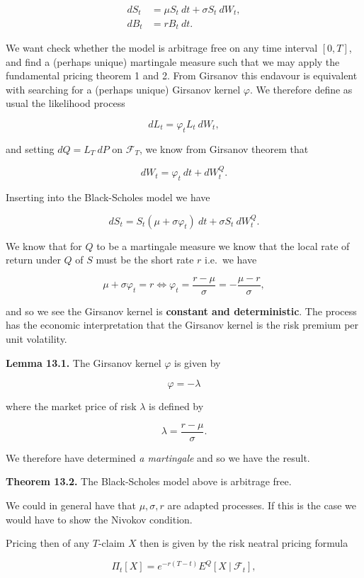 \documentclass[
]{article}
\begin{document}
\begin{align*}
dS_t &= \mu S_t\ dt+\sigma S_t\ dW_t,\\
dB_t &= r B_t\ dt.
\end{align*}

We want check whether the model is arbitrage free on any time interval
\([0,T]\), and find a (perhaps unique) martingale measure such that we
may apply the fundamental pricing theorem 1 and 2. From Girsanov this
endavour is equivalent with searching for a (perhaps unique) Girsanov
kernel \(\varphi\). We therefore define as usual the likelihood process

\[
dL_t=\varphi_ tL_t\ dW_t,
\]

and setting \(dQ=L_T\ dP\) on \(\mathcal{F}_T\), we know from Girsanov
theorem that

\[
dW_t=\varphi_t\ dt+dW_t^Q.
\]

Inserting into the Black-Scholes model we have

\[
dS_t=S_t(\mu + \sigma \varphi_t)\ dt+\sigma S_t\ dW_t^Q.
\]

We know that for \(Q\) to be a martingale measure we know that the local
rate of return under \(Q\) of \(S\) must be the short rate \(r\) i.e.~we
have

\[
\mu + \sigma \varphi_t=r\iff \varphi_t=\frac{r-\mu}{\sigma}=-\frac{\mu -r}{\sigma},
\]

and so we see the Girsanov kernel is \textbf{constant and
deterministic}. The process has the economic interpretation that the
Girsanov kernel is the risk premium per unit volatility.

\textbf{Lemma 13.1.} The Girsanov kernel \(\varphi\) is given by

\[
\varphi = -\lambda
\]

where the market price of risk \(\lambda\) is defined by

\[
\lambda =\frac{r-\mu}{\sigma}.
\]

We therefore have determined \emph{a martingale} and so we have the
result.

\textbf{Theorem 13.2.} The Black-Scholes model above is arbitrage free.

We could in general have that \(\mu,\sigma,r\) are adapted processes. If
this is the case we would have to show the Nivokov condition.

Pricing then of any \(T\)-claim \(X\) then is given by the risk neatral
pricing formula

\[
\Pi_t[X]=e^{-r(T-t)}E^Q[X\ \vert\ \mathcal{F}_t],
\]
\end{document}
